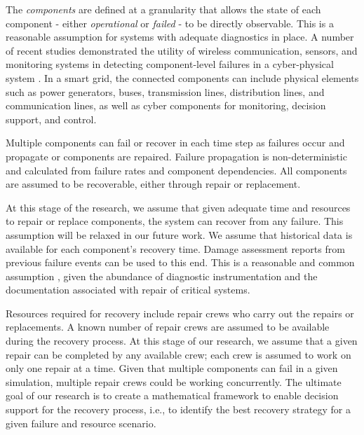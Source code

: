 \documentclass[runningheads]{llncs}
\begin{document}

The \emph{components} are defined at a granularity that allows the state of each component - either \emph{operational} or \emph{failed} - to be directly observable. This is a reasonable assumption for systems with adequate diagnostics in place. A number of recent studies demonstrated the utility of wireless communication, sensors, and monitoring systems in detecting component-level failures in a cyber-physical system \cite{aust_performance_2012, verma_wireless_2014, tashtarian_distributed_2018}. In a smart grid,  the connected components can include physical elements such as power generators, buses, transmission lines, distribution lines, and communication lines, as well as cyber components for monitoring, decision support, and control. 

Multiple components can fail or recover in each time step as failures occur and propagate or components are repaired. Failure propagation is non-deterministic and calculated from failure rates and component dependencies. All components are assumed to be recoverable, either through repair or replacement. 

At this stage of the research, we assume that given adequate time and resources to repair or replace components, the system can recover from any failure. This assumption will be relaxed in our future work. We assume that historical data is available for each component's recovery time. Damage assessment reports from previous failure events can be used to this end. This is a reasonable and common assumption \cite{yan_dynamic_2021}, given the abundance of diagnostic instrumentation and the documentation associated with repair of critical systems.

Resources required for recovery include repair crews who carry out the repairs or replacements. A known number of repair crews are assumed to be available during the recovery process. At this stage of our research, we assume that a given repair can be completed by any available crew; each crew is assumed to work on only one repair at a time. Given that multiple components can fail in a given simulation, multiple repair crews could be working concurrently. The ultimate goal of our research is to create a mathematical framework to enable decision support for the recovery process, i.e., to identify the best recovery strategy for a given failure and resource scenario.
\end{document}
